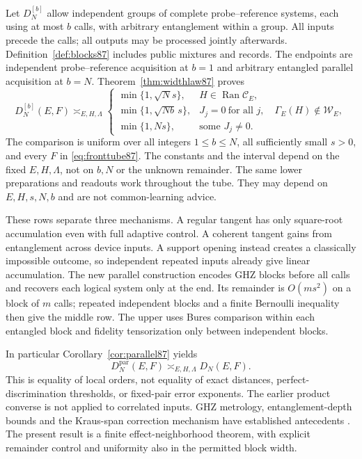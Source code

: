 Let $D_N^{[b]}$ allow independent groups of complete probe--reference
systems, each using at most $b$ calls, with arbitrary entanglement
within a group.  All inputs precede the calls; all outputs may be
processed jointly afterwards.  Definition~\ref{def:blocks87} includes
public mixtures and records.  The endpoints are independent
probe--reference acquisition at $b=1$ and arbitrary entangled
parallel acquisition at $b=N$.  Theorem~\ref{thm:widthlaw87} proves
\begin{equation}\label{eq:frontwidth87}
 D_N^{[b]}(E,F)\asymp_{E,H,\Lambda}
 \begin{cases}
 \min\{1,\sqrt N s\},&H\in\operatorname{Ran}\mathcal C_E,\\
 \min\{1,\sqrt{Nb}\,s\},&J_j=0\ \text{for all }j,
                        \quad\Gamma_E(H)\notin\mathcal W_E,\\
 \min\{1,Ns\},&\text{some }J_j\ne0.
 \end{cases}
\end{equation}
The comparison is uniform over all integers $1\le b\le N$,
all sufficiently small $s>0$, and every $F$ in
\eqref{eq:fronttube87}.  The constants and the interval depend on
the fixed $E,H,\Lambda$, not on $b,N$ or the unknown remainder.
The same lower preparations and readouts work throughout the tube.
They may depend on $E,H,s,N,b$ and are not common-learning advice.

These rows separate three mechanisms.  A regular tangent has only
square-root accumulation even with full adaptive control.  A
coherent tangent gains from entanglement across device inputs.
A support opening instead creates a classically impossible outcome,
so independent repeated inputs already give linear accumulation.
The new parallel construction encodes GHZ blocks before all calls
and recovers each logical system only at the end.  Its remainder is
$O(ms^2)$ on a block of $m$ calls; repeated independent blocks and
a finite Bernoulli inequality then give the middle row.  The upper
uses Bures comparison within each entangled block and fidelity
tensorization only between independent blocks.

In particular Corollary~\ref{cor:parallel87} yields
\[
 D_N^{\mathrm{par}}(E,F)\asymp_{E,H,\Lambda}D_N(E,F).
\]
This is equality of local orders, not equality of exact distances,
perfect-discrimination thresholds, or fixed-pair error exponents.
The earlier product converse is not applied to correlated inputs.
GHZ metrology, entanglement-depth bounds and the Kraus-span correction
mechanism have established antecedents
\cite{Hyllus78,Toth78,ZJ84,KL84}.  The present result is a
finite effect-neighborhood theorem, with explicit remainder control
and uniformity also in the permitted block width.

